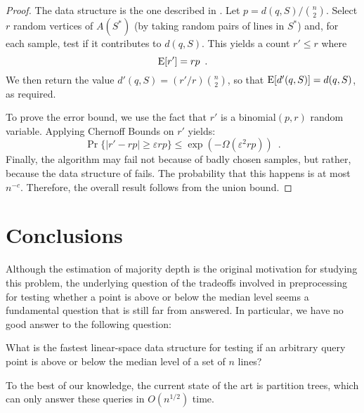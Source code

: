 \documentclass{patmorin}
\newcommand{\eps}{\varepsilon}
\begin{document}
\begin{proof}
  The data structure is the one described in .
  Let $p=d(q,S)/\binom{n}{2}$.  Select $r$ random vertices of $A(S^*)$
  (by taking random pairs of lines in $S^*$) and, for each sample, test
  if it contributes to $d(q,S)$.  This yields a count $r' \le r$ where
  \[ 
     \mathrm{E}[r'] = rp \enspace .
  \]
  We then return the value $d'(q,S)=(r'/r)\binom{n}{2}$, so that
  $\mathrm{E}[d'(q,S)]=d(q,S)$, as required.

  To prove the error bound, we use the fact that $r'$ is a binomial$(p,r)$
  random variable.  Applying Chernoff Bounds \cite{c52} on $r'$ yields:
  \[
     \Pr\{|r' - rp| \ge \eps rp\} \le \exp(-\Omega(\eps^2rp)) \enspace .
  \]
  Finally, the algorithm may fail not because of badly chosen samples,
  but rather, because the data structure of  fails.
  The probability that this happens is at most $n^{-c}$. Therefore,
  the overall result follows from the union bound.
\end{proof}

\section{Conclusions}

Although the estimation of majority depth is the original motivation for
studying this problem, the underlying question of the tradeoffs involved
in preprocessing for testing whether a point is above or below the median
level seems a fundamental question that is still far from answered.  In particular, we have no good answer to the following question:

\begin{op}
What is the fastest linear-space data structure for testing if an
arbitrary query point is above or below the median level of a set of
$n$ lines?
\end{op}

To the best of our knowledge, the current state of the art is partition
trees, which can only answer these queries in $O(n^{1/2})$ time.



\end{document}
